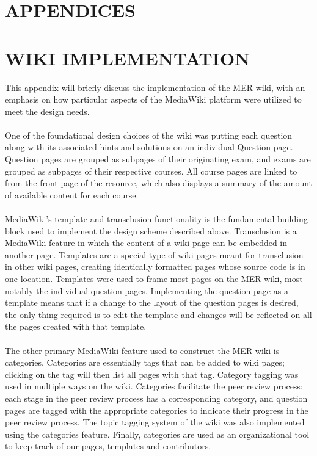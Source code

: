 \documentclass{primus}
\begin{document}
%
%

\section*{APPENDICES}

\appendix

\section{WIKI IMPLEMENTATION}\label{sec:Appendix}

This appendix will briefly discuss the implementation of the MER wiki, with an emphasis on how particular aspects of the MediaWiki platform were utilized to meet the design needs.
\\\\
\noindent{}One of the foundational design choices of the wiki was putting each question along with its associated hints and solutions on an individual Question page. Question pages are grouped as subpages of their originating exam, and exams are grouped as subpages of their respective courses. All course pages are linked to from the front page of the resource, which also displays a summary of the amount of available content for each course.
\\\\
\noindent{}MediaWiki’s template and transclusion functionality is the fundamental building block used to implement the design scheme described above. Transclusion is a MediaWiki feature in which the content of a wiki page can be embedded in another page. Templates are a special type of wiki pages meant for transclusion in other wiki pages, creating identically formatted pages whose source code is in one location. Templates were used to frame most pages on the MER wiki, most notably the individual question pages. Implementing the question page as a template means that if a change to the layout of the question pages is desired, the only thing required is to edit the template and changes will be reflected on all the pages created with that template.
\\\\
\noindent{}The other primary MediaWiki feature used to construct the MER wiki is categories. Categories are essentially tags that can be added to wiki pages; clicking on the tag will then list all pages with that tag. Category tagging was used in multiple ways on the wiki. Categories facilitate the peer review process: each stage in the peer review process has a corresponding category, and question pages are tagged with the appropriate categories to indicate their progress in the peer review process. The topic tagging system of the wiki was also implemented using the categories feature. Finally, categories are used as an organizational tool to keep track of our pages, templates and contributors.
\end{document}
